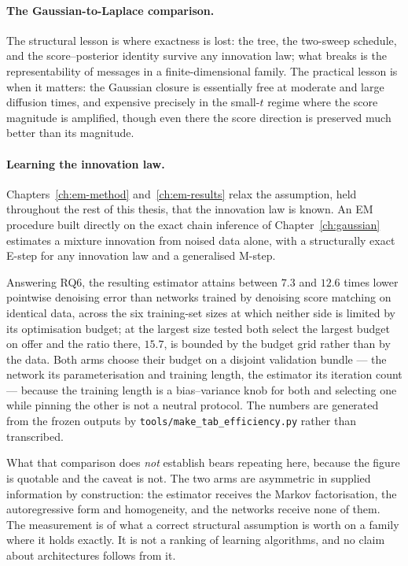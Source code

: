 \paragraph{The Gaussian-to-Laplace comparison.} The structural lesson is
where exactness is lost: the tree, the two-sweep schedule, and the
score--posterior identity survive any innovation law; what breaks is the
representability of messages in a finite-dimensional family. The
practical lesson is when it matters: the Gaussian closure is essentially
free at moderate and large diffusion times, and expensive precisely in
the small-$t$ regime where the score magnitude is amplified, though even
there the score direction is preserved much better than its magnitude.

\paragraph{Learning the innovation law.} Chapters~\ref{ch:em-method}
and~\ref{ch:em-results} relax the assumption, held throughout the rest of
this thesis, that the innovation law is known. An EM procedure built
directly on the exact chain inference of Chapter~\ref{ch:gaussian} estimates
a mixture innovation from noised data alone, with a structurally exact E-step
for any innovation law and a generalised M-step.

Answering RQ6, the resulting estimator attains between $7.3$ and $12.6$ times
lower pointwise denoising error than networks trained by denoising score
matching on identical data, across the six training-set sizes at which neither
side is limited by its optimisation budget; at the largest size tested both
select the largest budget on offer and the ratio there, $15.7$, is bounded by
the budget grid rather than by the data. Both arms choose their budget on a
disjoint validation bundle --- the network its parameterisation and training
length, the estimator its iteration count --- because the training length is a
bias--variance knob for both and selecting one while pinning the other is not a
neutral protocol. The numbers are generated from the frozen outputs by
\texttt{tools/make\_tab\_efficiency.py} rather than transcribed.

What that comparison does \emph{not} establish bears repeating here, because
the figure is quotable and the caveat is not. The two arms are asymmetric in
supplied information by construction: the estimator receives the Markov
factorisation, the autoregressive form and homogeneity, and the networks
receive none of them. The measurement is of what a correct structural
assumption is worth on a family where it holds exactly. It is not a ranking of
learning algorithms, and no claim about architectures follows from it.

